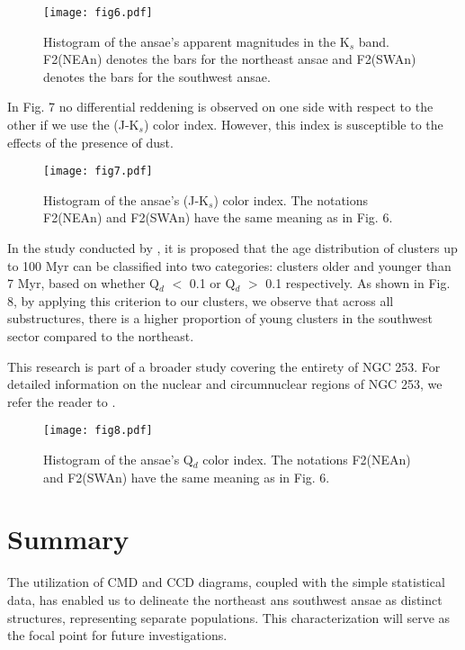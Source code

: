 \documentclass[baaa]{baaa}
\begin{document}
\begin{figure}[!t]
\centering
\texttt{[image: fig6.pdf]}
\caption{Histogram of the ansae's apparent magnitudes in the K$_{s}$ band. F2(NEAn) denotes the bars for the northeast ansae and F2(SWAn) denotes the bars for the southwest ansae.}
\label{Figura}
\end{figure}

In Fig. 7 no differential reddening is observed on one side with respect to the other if we use the (J-K$_{s}$) color index. However, this index is susceptible to the effects of the presence of dust.

\begin{figure}[!t]
\centering
\texttt{[image: fig7.pdf]}
\caption{Histogram of the ansae's (J-K$_{s}$) color index. The notations F2(NEAn) and F2(SWAn) have the same meaning as in Fig. 6.}
\label{Figura}
\end{figure}

In the study conducted by \citet{2013A&A...553A..74S}, it is proposed that the age distribution of clusters up to 100 Myr can be classified into two categories: clusters older and younger than 7 Myr, based on whether Q$_{d}$ $<$ 0.1 or Q$_{d}$ $>$ 0.1 respectively. As shown in Fig. 8, by applying this criterion to our clusters, we observe that across all substructures, there is a higher proportion of young clusters in the southwest sector compared to the northeast.

This research is part of a broader study covering the entirety of NGC 253. For detailed information on the nuclear and circumnuclear regions of NGC 253, we refer the reader to \citet{2022BAAA...63..232C}.

\begin{figure}[!t]
\centering
\texttt{[image: fig8.pdf]}
\caption{Histogram of the ansae's Q$_{d}$ color index. The notations F2(NEAn) and F2(SWAn) have the same meaning as in Fig. 6.}
\label{Figura}
\end{figure}

\section{Summary}

The utilization of CMD and CCD diagrams, coupled with the simple statistical data, has enabled us to delineate the northeast ans southwest ansae as distinct structures, representing separate populations. This characterization will serve as the focal point for future investigations.
\end{document}
